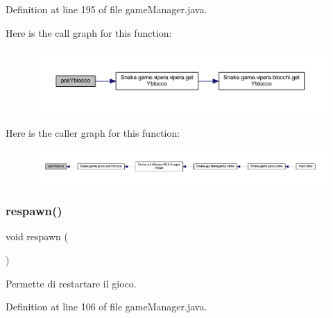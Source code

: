 Definition at line 195 of file game\+Manager.\+java.

Here is the call graph for this function\+:
\nopagebreak
\begin{figure}[H]
\begin{center}
\leavevmode
\includegraphics[width=350pt]{class_snake_1_1game_1_1utility_1_1game_manager_ac26b1474a291f2f7546e2e1cda1410b8_cgraph}
\end{center}
\end{figure}
Here is the caller graph for this function\+:
\nopagebreak
\begin{figure}[H]
\begin{center}
\leavevmode
\includegraphics[width=350pt]{class_snake_1_1game_1_1utility_1_1game_manager_ac26b1474a291f2f7546e2e1cda1410b8_icgraph}
\end{center}
\end{figure}
\mbox{\label{class_snake_1_1game_1_1utility_1_1game_manager_ac578ca44493fe34e6cb1b2093cf79341}} 
\subsubsection{\texorpdfstring{respawn()}{respawn()}}
{\footnotesize\ttfamily void respawn (\begin{DoxyParamCaption}{ }\end{DoxyParamCaption})}



Permette di restartare il gioco. 



Definition at line 106 of file game\+Manager.\+java.

